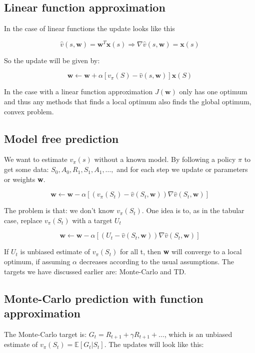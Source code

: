 \subsection{Linear function approximation}
In the case of linear functions the update looks like this

	\begin{equation}
		\hat{v}(s,\textbf{w}) = \textbf{w}^{T}\textbf{x}(s) \Rightarrow \nabla \hat{v}(s, \textbf{w}) = \textbf{x}(s)
	\end{equation}

So the update will be given by:

	\begin{equation}
		\textbf{w} \leftarrow \textbf{w} + \alpha [v_\pi(S) - \hat{v}(s,\textbf{w})]\textbf{x}(S)
	\end{equation}

In the case with a linear function approximation $J(\textbf{w})$ only has one optimum and thus any methods that finds a local optimum also finds the global optimum, convex problem. 

\subsection{Model free prediction}
We want to estimate $v_\pi(s)$ without a known model. By following a policy $\pi$ to get some data: $S_0,A_0,R_1,S_1,A_1,\ldots,$ and for each step we update or parameters or weights \textbf{w}. 

	\begin{equation}
		\textbf{w} \leftarrow \textbf{w} - \alpha [(v_\pi(S_t) - \hat{v}(S_t, \textbf{w}))\nabla \hat{v}(S_t,\textbf{w})]
	\end{equation}

The problem is that: we don't know $v_\pi(S_t)$. One idea is to, as in the tabular case, replace $v_\pi(S_t)$ with a target $U_t$

	\begin{equation}
		\textbf{w} \leftarrow \textbf{w} - \alpha [(U_t - \hat{v}(S_t, \textbf{w}))\nabla \hat{v}(S_t,\textbf{w})]
	\end{equation}

If $U_t$ is unbiased estimate of $v_\pi(S_t)$ for all t, then \textbf{w} will converge to a local optimum, if assuming $\alpha$ decreases according to the usual assumptions. The targets we have discussed earlier are: Monte-Carlo and TD.

\subsection{Monte-Carlo prediction with function approximation}
The Monte-Carlo target is: $G_t = R_{t+1} + \gamma R_{t+1} + \ldots$, which is an unbiased estimate of $v_\pi(S_t) = \mathbb{E}[G_t | S_t]$. The updates will look like this:

